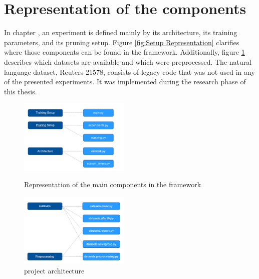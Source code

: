 \section{Representation of the components}
In chapter , an experiment is defined mainly by its architecture, its training parameters, and its pruning setup. Figure \ref{fig:Setup Representation} clarifies where those components can be found in the framework.
Additionally, figure \ref{fig:Dataset Representation} describes which datasets are available and which were preprocessed. The natural language dataset, Reuters-21578, consists of legacy code that was not used in any of the presented experiments. It was implemented during the research phase of this thesis.
\begin{figure}
	\begin{minipage}{0.45\textwidth}
		\centering
		\includegraphics[width=200px]{gfx/chp_5_setups.png}
		\caption{Representation of the main components in the framework}
		\label{fig:Setup Representation}
	\end{minipage}\hfill
	\begin{minipage}{0.45\textwidth}
		\centering
		\includegraphics[width=200px]{gfx/chp_5_datasets.png}
		\caption{project architecture}
		\label{fig:Dataset Representation}
	\end{minipage}
\end{figure}

